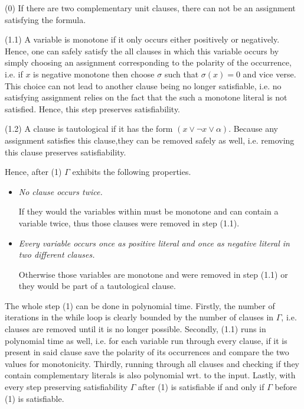 \documentclass[11pt,a4paper]{article}
\begin{document}
\begin{enumerate}
\begin{itemize}
(0) If there are two complementary unit clauses, there can not be an assignment satisfying the formula.

(1.1) A variable is monotone if it only occurs either positively or negatively. Hence, one can safely satisfy the all clauses in which this variable occurs by simply choosing an assignment corresponding to the polarity of the occurrence, i.e. if $x$ is negative monotone then choose $\sigma$ such that $\sigma(x)=0$ and vice verse. This choice can not lead to another clause being no longer satisfiable, i.e. no satisfying assignment relies on the fact that the such a monotone literal is not satisfied. Hence, this step preserves satisfiability.

(1.2) A clause is tautological if it has the form $(x \lor \neg x \lor \alpha)$. Because any assignment satisfies this clause,they can be removed safely as well, i.e. removing this clause preserves satisfiability.

Hence, after (1) $\Gamma$ exhibits the following properties.   
\begin{itemize}
\item \emph{No clause occurs twice. }


If they would the variables within must be monotone and can contain a variable twice, thus those clauses were removed in step (1.1).

%
%

\item\emph{ Every variable occurs once as positive literal and once as negative literal in two different clauses.}

Otherwise those variables are monotone and were removed in step (1.1) or they would be part of a tautological clause.
\end{itemize}
The whole step (1) can be done in polynomial time. Firstly, the number of iterations in the while loop is clearly bounded by the number of clauses in $\Gamma$, i.e. clauses are removed until it is no longer possible. Secondly, (1.1) runs in polynomial time as well, i.e. for each variable run through every clause, if it is present in said clause save the polarity of its occurrences and compare the two values for monotonicity. Thirdly, running through all clauses and checking if they contain complementary literals is also polynomial wrt. to the input.
Lastly,  with every step preserving satisfiability $\Gamma$ after (1) is satisfiable if and only if $\Gamma$ before (1) is satisfiable. \\



\end{itemize}
\end{enumerate}
\end{document}
